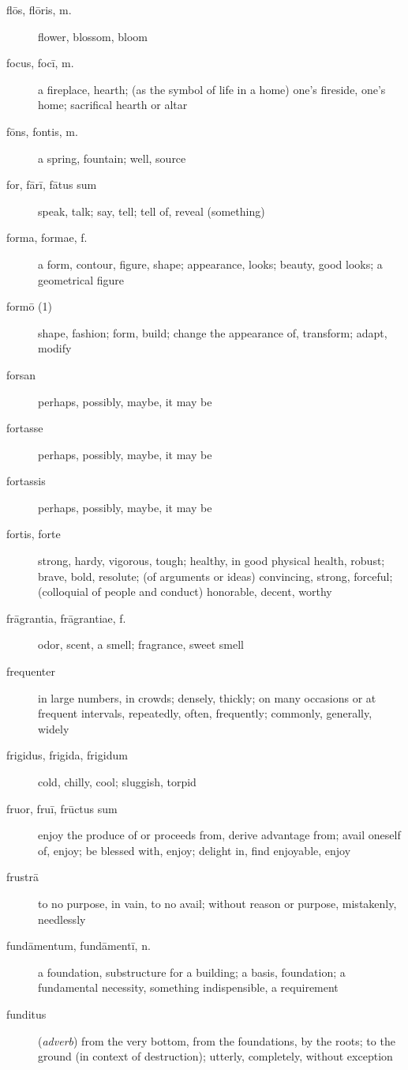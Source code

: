 \begin{description}
    \item[flōs, flōris, m.] flower, blossom, bloom
    \item[focus, focī, m.] a fireplace, hearth; (as the symbol of life in a home) one's fireside, one's home; sacrifical hearth or altar
    \item[fōns, fontis, m.] a spring, fountain; well, source
    \item[for, fārī, fātus sum] speak, talk; say, tell; tell of, reveal (something)
    \item[forma, formae, f.] a form, contour, figure, shape; appearance, looks; beauty, good looks; a geometrical figure
    \item[formō (1)] shape, fashion; form, build; change the appearance of, transform; adapt, modify
    \item[forsan] perhaps, possibly, maybe, it may be
    \item[fortasse] perhaps, possibly, maybe, it may be
    \item[fortassis] perhaps, possibly, maybe, it may be
    \item[fortis, forte] strong, hardy, vigorous, tough; healthy, in good physical health, robust; brave, bold, resolute; (of arguments or ideas) convincing, strong, forceful; (colloquial of people and conduct) honorable, decent, worthy
    \item[frāgrantia, frāgrantiae, f.] odor, scent, a smell; fragrance, sweet smell
    \item[frequenter] in large numbers, in crowds; densely, thickly; on many occasions or at frequent intervals, repeatedly, often, frequently; commonly, generally, widely
    \item[frigidus, frigida, frigidum] cold, chilly, cool; sluggish, torpid
    \item[fruor, fruī, frūctus sum] enjoy the produce of or proceeds from, derive advantage from; avail oneself of, enjoy; be blessed with, enjoy; delight in, find enjoyable, enjoy
    \item[frustrā] to no purpose, in vain, to no avail; without reason or purpose, mistakenly, needlessly
    \item[fundāmentum, fundāmentī, n.] a foundation, substructure for a building; a basis, foundation; a fundamental necessity, something indispensible, a requirement
    \item[funditus] (\textit{adverb}) from the very bottom, from the foundations, by the roots; to the ground (in context of destruction); utterly, completely, without exception

\end{description}
